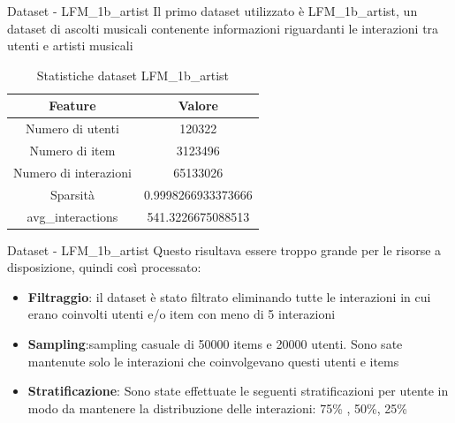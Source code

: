 
\begin{frame}{Dataset - LFM\_1b\_artist}
\small
Il primo dataset utilizzato è LFM\_1b\_artist, un dataset di ascolti musicali contenente informazioni riguardanti le interazioni tra utenti e artisti musicali

\begin{table}[H]
\centering
\begin{tabular}{|c|c|}
\hline
\textbf{Feature} & \textbf{Valore} \\
\hline
Numero di utenti & 120322 \\
\hline
Numero di item & 3123496 \\
\hline
Numero di interazioni & 65133026 \\
\hline
Sparsità & 0.9998266933373666 \\
\hline
avg\_interactions & 541.3226675088513 \\
\hline
\end{tabular}
\caption{Statistiche dataset LFM\_1b\_artist}
\end{table}
\end{frame}

\begin{frame}{Dataset - LFM\_1b\_artist}
    Questo risultava essere troppo grande per le risorse a disposizione, quindi così processato:
    \begin{itemize}
        \item  \textbf{Filtraggio}: il dataset è stato filtrato eliminando tutte le interazioni in cui erano coinvolti utenti e/o item
        con meno di 5 interazioni
        \item  \textbf{Sampling}:sampling casuale di 50000 items e 20000 utenti. Sono sate mantenute solo le interazioni che coinvolgevano questi utenti e items
        \item \textbf{Stratificazione}: Sono state effettuate le seguenti stratificazioni per utente in modo da mantenere la distribuzione delle interazioni: 75\% , 50\%, 25\%
    \end{itemize}
\end{frame}





